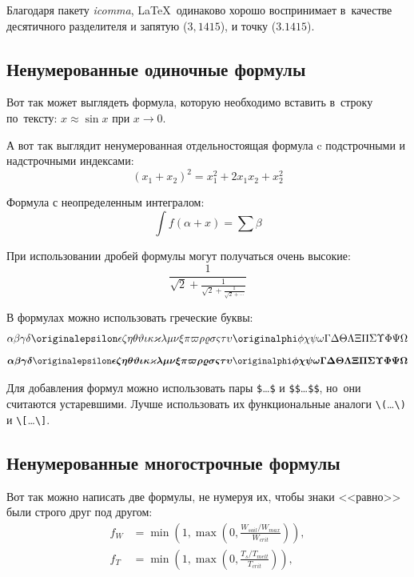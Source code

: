 Благодаря пакету \textit{icomma}, \LaTeX~одинаково хорошо воспринимает
в~качестве десятичного разделителя и запятую (\(3,1415\)), и точку (\(3.1415\)).

\subsection{Ненумерованные одиночные формулы}\label{subsec:ch1/sec3/sub1}

Вот так может выглядеть формула, которую необходимо вставить в~строку
по~тексту: \(x \approx \sin x\) при \(x \to 0\).

А вот так выглядит ненумерованная отдельностоящая формула c подстрочными
и надстрочными индексами:
\[
    (x_1+x_2)^2 = x_1^2 + 2 x_1 x_2 + x_2^2
\]

Формула с неопределенным интегралом:
\[
    \int f(\alpha+x)=\sum\beta
\]

При использовании дробей формулы могут получаться очень высокие:
\[
    \frac{1}{\sqrt{2}+
        \displaystyle\frac{1}{\sqrt{2}+
            \displaystyle\frac{1}{\sqrt{2}+\cdots}}}
\]

В формулах можно использовать греческие буквы:
\[
    \alpha\beta\gamma\delta\originalepsilon\epsilon\zeta\eta\theta%
    \vartheta\iota\kappa\varkappa\lambda\mu\nu\xi\pi\varpi\rho\varrho%
    \sigma\varsigma\tau\upsilon\originalphi\phi\chi\psi\omega\Gamma\Delta%
    \Theta\Lambda\Xi\Pi\Sigma\Upsilon\Phi\Psi\Omega
\]
\[%
    \boldsymbol{\alpha\beta\gamma\delta\originalepsilon\epsilon\zeta\eta%
        \theta\vartheta\iota\kappa\varkappa\lambda\mu\nu\xi\pi\varpi\rho%
        \varrho\sigma\varsigma\tau\upsilon\originalphi\phi\chi\psi\omega\Gamma%
        \Delta\Theta\Lambda\Xi\Pi\Sigma\Upsilon\Phi\Psi\Omega}
\]

Для добавления формул можно использовать пары \verb+$+\dots\verb+$+ и \verb+$$+\dots\verb+$$+,
но~они считаются устаревшими.
Лучше использовать их функциональные аналоги \verb+\(+\dots\verb+\)+ и \verb+\[+\dots\verb+\]+.

\subsection{Ненумерованные многострочные формулы}\label{subsec:ch1/sec3/sub2}

Вот так можно написать две формулы, не нумеруя их, чтобы знаки <<равно>> были
строго друг под другом:
\begin{align}
    f_W & =  \min \left( 1, \max \left( 0, \frac{W_{soil} / W_{max}}{W_{crit}} \right)  \right), \nonumber \\
    f_T & =  \min \left( 1, \max \left( 0, \frac{T_s / T_{melt}}{T_{crit}} \right)  \right), \nonumber
\end{align}

